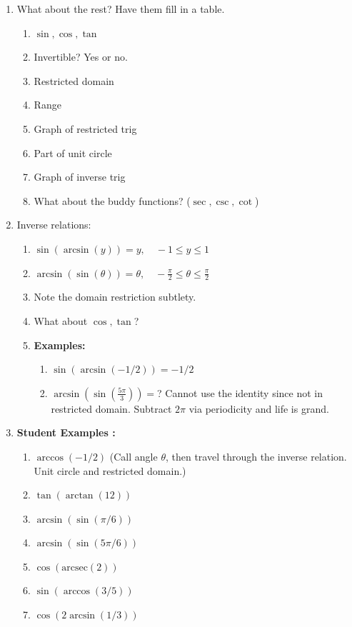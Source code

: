 \documentclass{article}
\begin{document}
\begin{enumerate}
\item What about the rest? Have them fill in a table.
\begin{enumerate}
\item $\sin, \cos, \tan$
\item Invertible? Yes or no.
\item Restricted domain
\item Range
\item Graph of restricted trig
\item Part of unit circle
\item Graph of inverse trig
\item What about the buddy functions? ($\sec, \csc, \cot$)
\end{enumerate}

\item Inverse relations:
\begin{enumerate}
\item $\sin(\arcsin(y)) = y, \quad -1\leq y \leq 1$
\item $\arcsin(\sin(\theta)) = \theta, \quad -\frac{\pi}{2}\leq \theta \leq \frac{\pi}{2}$
\item Note the domain restriction subtlety.
\item What about $\cos,\tan$?
\item {\bf Examples:}
\begin{enumerate}
\item $\sin(\arcsin(-1/2)) = -1/2$
\item $\arcsin(\sin(\frac{5\pi}{3})) = $? Cannot use the identity since not in restricted domain. Subtract $2\pi$ via periodicity and life is grand.
\end{enumerate}
\end{enumerate}

\item {\bf Student Examples :}
\begin{enumerate}
\item $\arccos(-1/2)$ (Call angle $\theta$, then travel through the inverse relation. Unit circle and restricted domain.)
\item $\tan(\arctan(12))$
\item $\arcsin(\sin(\pi/6))$
\item $\arcsin(\sin(5\pi/6))$
\item $\cos(\text{arcsec}(2))$
\item $\sin (\arccos(3/5))$
\item $\cos(2\arcsin(1/3))$
\end{enumerate}


\end{enumerate}
\end{document}

